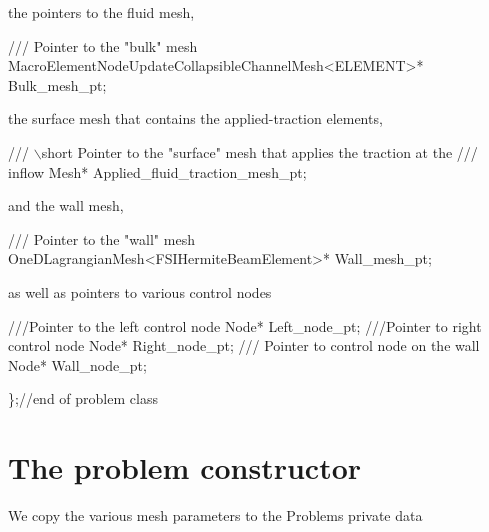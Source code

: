 the pointers to the fluid mesh,


\begin{DoxyCodeInclude}
 \textcolor{comment}{/// Pointer to the "bulk" mesh}
 MacroElementNodeUpdateCollapsibleChannelMesh<ELEMENT>* Bulk\_mesh\_pt;

\end{DoxyCodeInclude}


the surface mesh that contains the applied-\/traction elements,


\begin{DoxyCodeInclude}
 \textcolor{comment}{/// \(\backslash\)short Pointer to the "surface" mesh that applies the traction at the}
\textcolor{comment}{ /// inflow}
\textcolor{comment}{} Mesh* Applied\_fluid\_traction\_mesh\_pt; 

\end{DoxyCodeInclude}


and the wall mesh,


\begin{DoxyCodeInclude}
 \textcolor{comment}{}
\textcolor{comment}{ /// Pointer to the "wall" mesh}
\textcolor{comment}{} OneDLagrangianMesh<FSIHermiteBeamElement>* Wall\_mesh\_pt; 

\end{DoxyCodeInclude}


as well as pointers to various control nodes


\begin{DoxyCodeInclude}
\textcolor{comment}{}
\textcolor{comment}{ ///Pointer to the left control node}
\textcolor{comment}{} Node* Left\_node\_pt;
 \textcolor{comment}{}
\textcolor{comment}{ ///Pointer to right control node}
\textcolor{comment}{} Node* Right\_node\_pt;
 \textcolor{comment}{}
\textcolor{comment}{ /// Pointer to control node on the wall}
\textcolor{comment}{} Node* Wall\_node\_pt;

\};\textcolor{comment}{//end of problem class}

\end{DoxyCodeInclude}




 

\hypertarget{index_problemcontr}{}\section{The problem constructor}\label{index_problemcontr}
We copy the various mesh parameters to the Problem\textquotesingle{}s private data

